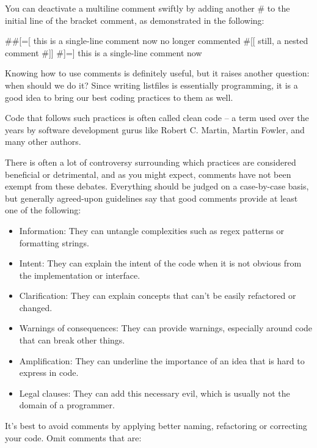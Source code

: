 You can deactivate a multiline comment swiftly by adding another \# to the initial line of the bracket comment, as demonstrated in the following:

\begin{cmake}
##[=[ this is a single-line comment now
no longer commented
  #[[
    still, a nested comment
  #]]
#]=] this is a single-line comment now
\end{cmake}

Knowing how to use comments is definitely useful, but it raises another question: when should we do it? Since writing listfiles is essentially programming, it is a good idea to bring our best coding practices to them as well.

Code that follows such practices is often called clean code – a term used over the years by software development gurus like Robert C. Martin, Martin Fowler, and many other authors.

There is often a lot of controversy surrounding which practices are considered beneficial or detrimental, and as you might expect, comments have not been exempt from these debates. Everything should be judged on a case-by-case basis, but generally agreed-upon guidelines say that good comments provide at least one of the following:

\begin{itemize}
\item
Information: They can untangle complexities such as regex patterns or formatting strings.

\item
Intent: They can explain the intent of the code when it is not obvious from the implementation or interface.

\item
Clarification: They can explain concepts that can’t be easily refactored or changed.

\item
Warnings of consequences: They can provide warnings, especially around code that can break other things.

\item
Amplification: They can underline the importance of an idea that is hard to express in code.

\item
Legal clauses: They can add this necessary evil, which is usually not the domain of a programmer.
\end{itemize}

It’s best to avoid comments by applying better naming, refactoring or correcting your code. Omit comments that are:


